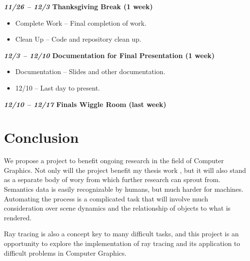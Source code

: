 \documentclass[conference]{IEEEtran}
\begin{document}
\textbf{\textit{11/26 -- 12/3} Thanksgiving Break (1 week)}
\begin{itemize}
\item Complete Work -- Final completion of work.
\item Clean Up -- Code and repository clean up.
\end{itemize}
\textbf{\textit{12/3 -- 12/10} Documentation for Final Presentation (1 week)}
\begin{itemize}
\item Documentation -- Slides and other documentation.
\item 12/10 -- Last day to present.
\end{itemize}
\textbf{\textit{12/10 -- 12/17} Finals Wiggle Room (last week)}

\section{Conclusion}
\label{sec:conclusion}
We propose a project to benefit ongoing research in the field of Computer Graphics.
Not only will the project benefit my thesis work \cite{thesis_harris},
but it will also stand as a separate body of wory from which further research can sprout from.
Semantics data is easily recognizable by humans, but much harder for machines.
Automating the process is a complicated task that will involve much consideration over
scene dynamics and the relationship of objects to what is rendered.

Ray tracing is also a concept
key to many difficult tasks, and this project is an
opportunity to explore the implementation of ray tracing and its application
to difficult problems in Computer Graphics.




\end{document}
